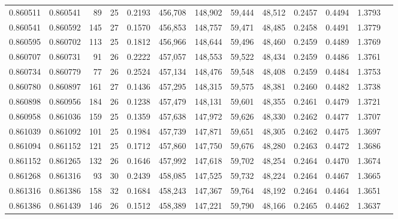 \begin{tabular}{rrrrrrrrrrrrr}
0.860511 & 0.860541 &    89 &  25 &                                     0.2193 & 456,708 & 148,902 &  59,444 &  48,512 & 0.2457 & 0.4494 & 1.3793 \\
0.860541 & 0.860592 &   145 &  27 &                                     0.1570 & 456,853 & 148,757 &  59,471 &  48,485 & 0.2458 & 0.4491 & 1.3779 \\
0.860595 & 0.860702 &   113 &  25 &                                     0.1812 & 456,966 & 148,644 &  59,496 &  48,460 & 0.2459 & 0.4489 & 1.3769 \\
0.860707 & 0.860731 &    91 &  26 &                                     0.2222 & 457,057 & 148,553 &  59,522 &  48,434 & 0.2459 & 0.4486 & 1.3761 \\
0.860734 & 0.860779 &    77 &  26 &                                     0.2524 & 457,134 & 148,476 &  59,548 &  48,408 & 0.2459 & 0.4484 & 1.3753 \\
0.860780 & 0.860897 &   161 &  27 &                                     0.1436 & 457,295 & 148,315 &  59,575 &  48,381 & 0.2460 & 0.4482 & 1.3738 \\
0.860898 & 0.860956 &   184 &  26 &                                     0.1238 & 457,479 & 148,131 &  59,601 &  48,355 & 0.2461 & 0.4479 & 1.3721 \\
0.860958 & 0.861036 &   159 &  25 &                                     0.1359 & 457,638 & 147,972 &  59,626 &  48,330 & 0.2462 & 0.4477 & 1.3707 \\
0.861039 & 0.861092 &   101 &  25 &                                     0.1984 & 457,739 & 147,871 &  59,651 &  48,305 & 0.2462 & 0.4475 & 1.3697 \\
0.861094 & 0.861152 &   121 &  25 &                                     0.1712 & 457,860 & 147,750 &  59,676 &  48,280 & 0.2463 & 0.4472 & 1.3686 \\
0.861152 & 0.861265 &   132 &  26 &                                     0.1646 & 457,992 & 147,618 &  59,702 &  48,254 & 0.2464 & 0.4470 & 1.3674 \\
0.861268 & 0.861316 &    93 &  30 &                                     0.2439 & 458,085 & 147,525 &  59,732 &  48,224 & 0.2464 & 0.4467 & 1.3665 \\
0.861316 & 0.861386 &   158 &  32 &                                     0.1684 & 458,243 & 147,367 &  59,764 &  48,192 & 0.2464 & 0.4464 & 1.3651 \\
0.861386 & 0.861439 &   146 &  26 &                                     0.1512 & 458,389 & 147,221 &  59,790 &  48,166 & 0.2465 & 0.4462 & 1.3637 \\

\end{tabular}
